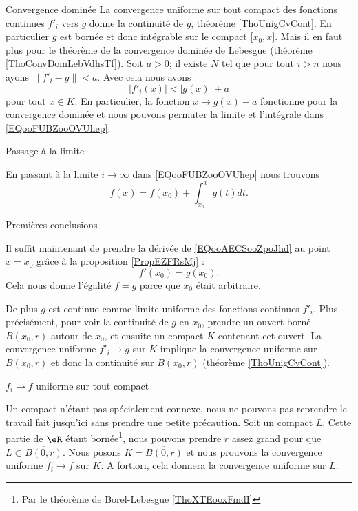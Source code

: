 \begin{normaltext}
\begin{subproof}
		\item[Convergence dominée]
		La convergence uniforme sur tout compact des fonctions continues \( f'_i\) vers \( g\) donne la continuité de \( g\), théorème \ref{ThoUnigCvCont}. En particulier \( g\) est bornée et donc intégrable sur le compact \( \mathopen[ x_0 , x \mathclose]\). Mais il en faut plus pour le théorème de la convergence dominée de Lebesgue (théorème \ref{ThoConvDomLebVdhsTf}). Soit \( a>0\); il existe \( N\) tel que pour tout \( i>n\) nous ayons \( \| f'_i-g \|<a\). Avec cela nous avons
		\begin{equation}
			| f'_i(x) |<| g(x) |+a
		\end{equation}
		pour tout \( x\in K\). En particulier, la fonction \( x\mapsto g(x)+a\) fonctionne pour la convergence dominée et nous pouvons permuter la limite et l'intégrale dans \eqref{EQooFUBZooOVUhep}.

		\item[Passage à la limite]

		En passant à la limite \( i\to \infty\) dans \eqref{EQooFUBZooOVUhep} nous trouvons
		\begin{equation}        \label{EQooAECSooZpoJhd}
			f(x)=f(x_0)+\int_{x_0}^xg(t)dt.
		\end{equation}
		\item[Premières conclusions]

		Il suffit maintenant de prendre la dérivée de \eqref{EQooAECSooZpoJhd} au point \( x=x_0\) grâce à la proposition \ref{PropEZFRsMj} :
		\begin{equation}
			f'(x_0)=g(x_0).
		\end{equation}
		Cela nous donne l'égalité \( f=g\) parce que \( x_0\) était arbitraire.

		De plus \( g\) est continue comme limite uniforme des fonctions continues \( f'_i\). Plus précisément, pour voir la continuité de \( g\) en \( x_0\), prendre un ouvert borné \( B(x_0,r)\) autour de \( x_0\), et ensuite un compact \( K\) contenant cet ouvert. La convergence uniforme \( f'_i\to g\) sur \( K\) implique la convergence uniforme sur \( B(x_0,r)\) et donc la continuité sur \( B(x_0,r)\) (théorème \ref{ThoUnigCvCont}).

		\item[\( f_i\to f\) uniforme sur tout compact]

		Un compact n'étant pas spécialement connexe, nous ne pouvons pas reprendre le travail fait jusqu'ici sans prendre une petite précaution. Soit un compact \( L\). Cette partie de \( \eR\) étant bornée\footnote{Par le théorème de Borel-Lebesgue \ref{ThoXTEooxFmdI}}, nous pouvons prendre \( r\) assez grand pour que \( L\subset \overline{ B(0,r) }\). Nous posons \( K=\overline{ B(0,r) }\) et nous prouvons la convergence uniforme \( f_i\to f\) sur \( K\). A fortiori, cela donnera la convergence uniforme sur \( L\).


\end{subproof}
\end{normaltext}
